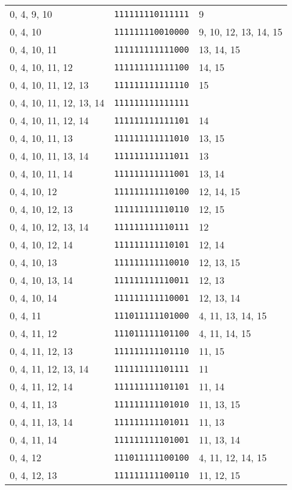 \documentclass[a4paper,12pt]{article}
\begin{document}
\begin{longtable}{l|l|l}
        0, 4, 9, 10&\texttt{111111110111111}&9\\
        0, 4, 10&\texttt{111111110010000}&9, 10, 12, 13, 14, 15\\
        0, 4, 10, 11&\texttt{111111111111000}&13, 14, 15\\
        0, 4, 10, 11, 12&\texttt{111111111111100}&14, 15\\
        0, 4, 10, 11, 12, 13&\texttt{111111111111110}&15\\
        0, 4, 10, 11, 12, 13, 14&\texttt{111111111111111}&\\
        0, 4, 10, 11, 12, 14&\texttt{111111111111101}&14\\
        0, 4, 10, 11, 13&\texttt{111111111111010}&13, 15\\
        0, 4, 10, 11, 13, 14&\texttt{111111111111011}&13\\
        0, 4, 10, 11, 14&\texttt{111111111111001}&13, 14\\
        0, 4, 10, 12&\texttt{111111111110100}&12, 14, 15\\
        0, 4, 10, 12, 13&\texttt{111111111110110}&12, 15\\
        0, 4, 10, 12, 13, 14&\texttt{111111111110111}&12\\
        0, 4, 10, 12, 14&\texttt{111111111110101}&12, 14\\
        0, 4, 10, 13&\texttt{111111111110010}&12, 13, 15\\
        0, 4, 10, 13, 14&\texttt{111111111110011}&12, 13\\
        0, 4, 10, 14&\texttt{111111111110001}&12, 13, 14\\
        0, 4, 11&\texttt{111011111101000}&4, 11, 13, 14, 15\\
        0, 4, 11, 12&\texttt{111011111101100}&4, 11, 14, 15\\
        0, 4, 11, 12, 13&\texttt{111111111101110}&11, 15\\
        0, 4, 11, 12, 13, 14&\texttt{111111111101111}&11\\
        0, 4, 11, 12, 14&\texttt{111111111101101}&11, 14\\
        0, 4, 11, 13&\texttt{111111111101010}&11, 13, 15\\
        0, 4, 11, 13, 14&\texttt{111111111101011}&11, 13\\
        0, 4, 11, 14&\texttt{111111111101001}&11, 13, 14\\
        0, 4, 12&\texttt{111011111100100}&4, 11, 12, 14, 15\\
        0, 4, 12, 13&\texttt{111111111100110}&11, 12, 15\\

\end{longtable}
\end{document}
